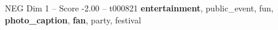 \begin{textsample}{NEG Dim 1 – Score -2.00 – t000821}  \label{ex:f1_neg_005}
\textbf{entertainment}, public\_event, fun, \textbf{photo\_caption}, \textbf{fan}, party, festival

\end{textsample}
